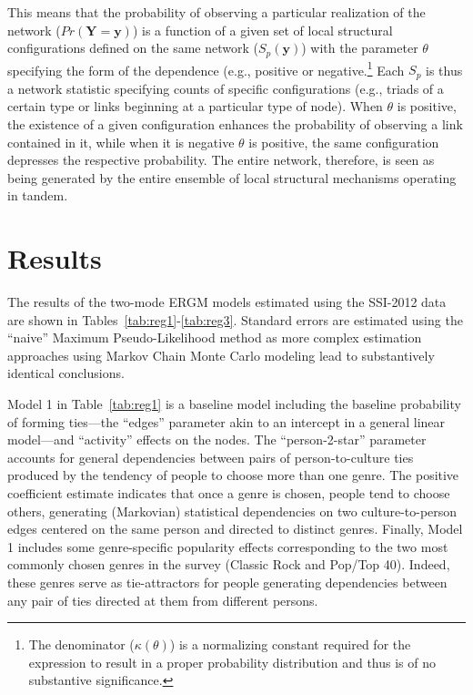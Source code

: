 \documentclass[preprint,12pt,authoryear]{elsarticle}
\begin{document}
This means that the probability of observing a particular realization of the network ($Pr(\mathbf{Y} = \mathbf{y})$) is a function of a given set of local structural configurations defined on the same network ($S_p(\mathbf{y})$) with the parameter $\theta$ specifying the form of the dependence (e.g., positive or negative.\footnote{The denominator ($\kappa(\theta)$) is a normalizing constant required for the expression to result in a proper probability distribution and thus is of no substantive significance.} Each $S_p$ is thus a network statistic specifying counts of specific configurations (e.g., triads of a certain type or links beginning at a particular type of node). When $\theta$ is positive, the existence of a given configuration enhances the probability of observing a link contained in it, while when it is negative $\theta$ is positive, the same configuration depresses the respective probability. The entire network, therefore, is seen as being generated by the entire ensemble of local structural mechanisms operating in tandem. 

\section{Results}
\label{sec:results}
The results of the two-mode ERGM models estimated using the SSI-2012 data are shown in Tables~\ref{tab:reg1}-\ref{tab:reg3}. Standard errors are estimated using the ``naive'' Maximum Pseudo-Likelihood method as more complex estimation approaches using Markov Chain Monte Carlo modeling lead to substantively identical conclusions. 

Model 1 in Table~\ref{tab:reg1} is a baseline model including the baseline probability of forming ties---the ``edges'' parameter akin to an intercept in a general linear model---and ``activity'' effects on the nodes. The ``person-2-star'' parameter accounts for general dependencies between pairs of person-to-culture ties produced by the tendency of people to choose more than one genre. The positive coefficient estimate indicates that once a genre is chosen, people tend to choose others, generating (Markovian) statistical dependencies on two culture-to-person edges centered on the same person and directed to distinct genres. Finally, Model 1 includes some genre-specific popularity effects corresponding to the two most commonly chosen genres in the survey (Classic Rock and Pop/Top 40). Indeed, these genres serve as tie-attractors for people generating dependencies between any pair of ties directed at them from different persons. 
\end{document}
